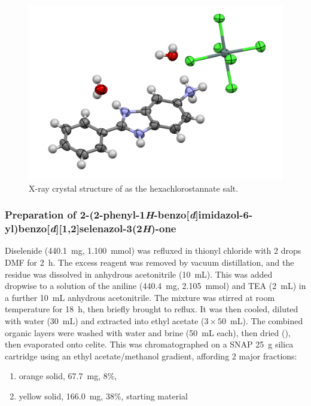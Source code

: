 \begin{refsection}
\begin{figure}[ht]
    \centering
    \includegraphics[width=0.8\linewidth]{Figures/rhs-amine-xray.pdf}
    \caption{X-ray crystal structure of  as the hexachlorostannate salt.}
    \label{fig:rhs-amine-xray}
\end{figure}

\subsubsection[Preparation of \refcmpd{ebs-rhs}]{Preparation of 2-(2-phenyl-1\emph{H}-benzo[\emph{d}]imidazol-6-yl)benzo[\emph{d}][1,2]selenazol-3(2\emph{H})-one }
Diselenide  (440.1~mg, 1.100~mmol) was refluxed in thionyl chloride with 2 drops DMF for 2~h.
The excess reagent was removed by vacuum distillation, and the residue was dissolved in anhydrous acetonitrile (10~mL).
This was added dropwise to a solution of the aniline  (440.4~mg, 2.105~mmol) and TEA (2~mL) in a further 10~mL anhydrous acetonitrile.
The mixture was stirred at room temperature for 18~h, then briefly brought to reflux.
It was then cooled, diluted with water (30~mL) and extracted into ethyl acetate ($3\times50$~mL).
The combined organic layers were washed with water and brine (50~mL each), then dried (), then evaporated onto celite.
This was chromatographed on a SNAP 25~g silica cartridge using an ethyl acetate/methanol gradient, affording 2 major fractions:
\begin{enumerate}
    \item orange solid, 67.7~mg, 8\%, 
    \item yellow solid, 166.0~mg, 38\%, starting material 
\end{enumerate}


\end{refsection}
